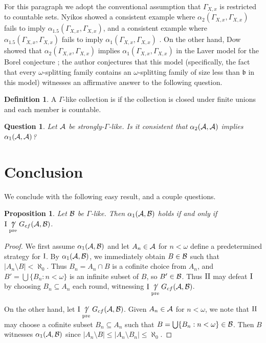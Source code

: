 \documentclass{amsart}
\theoremstyle{plain}
\newtheorem{proposition}[theorem]{Proposition}
\newtheorem{question}[theorem]{Question}
\theoremstyle{definition}
\newtheorem{definition}[theorem]{Definition}
\theoremstyle{remark}
\theoremstyle{plain}
\theoremstyle{definition}
\theoremstyle{remark}
\begin{document}
For this paragraph we adopt the conventional assumption that
\(\Gamma_{X,x}\) is restricted to countable sets.
Nyikos showed a consistent example
where \(\alpha_2(\Gamma_{X,x},\Gamma_{X,x})\) fails to imply
\(\alpha_{1.5}(\Gamma_{X,x},\Gamma_{X,x})\), and a consistent example where
\(\alpha_{1.5}(\Gamma_{X,x},\Gamma_{X,x})\) fails to imply
\(\alpha_{1}(\Gamma_{X,x},\Gamma_{X,x})\) \cite{MR1195504}.
On the other hand, Dow showed that \(\alpha_2(\Gamma_{X,x},\Gamma_{X,x})\)
implies \(\alpha_{1}(\Gamma_{X,x},\Gamma_{X,x})\) in the Laver model
for the Borel conjecture \cite{MR975638}; the author conjectures
that this model (specifically, the fact that
every \(\omega\)-splitting family contains an \(\omega\)-splitting
family of size less than \(\mathfrak b\) in this model) witnesses
an affirmative answer to the following question.

\begin{definition}
A \(\Gamma\)-like collection is 
if the collection is closed under finite unions and each member
is countable.
\end{definition}

\begin{question}
Let \(\mathcal{A}\) be strongly-\(\Gamma\)-like.
Is it consistent that \(\alpha_2(\mathcal{A},\mathcal{A})\)
implies \(\alpha_1(\mathcal{A},\mathcal{A})\)?
\end{question}


\section{Conclusion}

We conclude with the following easy result, and a couple questions.

\begin{proposition}
Let \(\mathcal{B}\) be \(\Gamma\)-like. Then \(\alpha_1(\mathcal{A},\mathcal{B})\) holds if and only
if \(\mathrm{I}\underset{\text{pre}}{\not\uparrow} G_{cf}(\mathcal{A},\mathcal{B})\).
\end{proposition}

\begin{proof}
We first assume \(\alpha_1(\mathcal{A},\mathcal{B})\) and let \(A_n\in\mathcal{A}\) for \(n<\omega\)
define a predetermined strategy for \(\mathrm{I}\). By \(\alpha_1(\mathcal{A},\mathcal{B})\), we
immediately obtain \(B\in\mathcal{B}\) such that \(|A_n\setminus B|<\aleph_0\). Thus
\(B_n=A_n\cap B\) is a cofinite choice from \(A_n\), and 
\(B'=\bigcup\{B_n:n<\omega\}\) is an infinite subset of \(B\),
so \(B'\in\mathcal{B}\). Thus \(\mathrm{II}\) may defeat \(\mathrm{I}\) by choosing
\(B_n\subseteq A_n\) each round, witnessing \(\mathrm{I}\underset{\text{pre}}{\not\uparrow} G_{cf}(\mathcal{A},\mathcal{B})\).

On the other hand, let \(\mathrm{I}\underset{\text{pre}}{\not\uparrow} G_{cf}(\mathcal{A},\mathcal{B})\). Given \(A_n\in\mathcal{A}\)
for \(n<\omega\), we note that \(\mathrm{II}\) may choose a cofinite subset \(B_n\subseteq A_n\)
such that \(B=\bigcup\{B_n:n<\omega\}\in\mathcal{B}\). Then \(B\) witnesses \(\alpha_1(\mathcal{A},\mathcal{B})\)
since \(|A_n\setminus B|\leq|A_n\setminus B_n|\leq\aleph_0\).
\end{proof}
\end{document}
